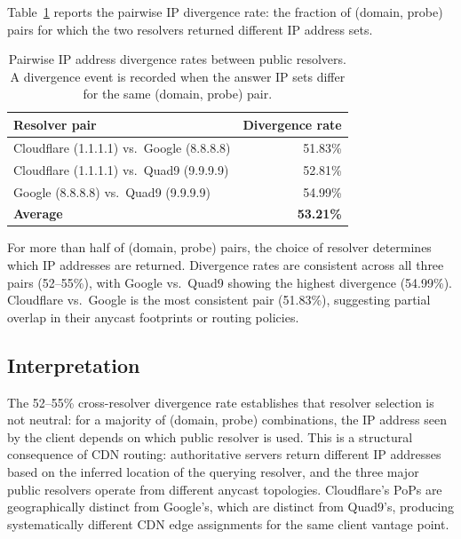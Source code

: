 Table~\ref{tab:4.5} reports the pairwise \ac{IP} divergence rate: the fraction of (domain, probe) pairs for which the two resolvers returned different \ac{IP} address sets.

\begin{table}[H]
\centering
\small
\begin{tabular}{l r}
\toprule
\textbf{Resolver pair} & \textbf{Divergence rate} \\
\midrule
Cloudflare (1.1.1.1) vs.\ Google (8.8.8.8)  & 51.83\% \\
Cloudflare (1.1.1.1) vs.\ Quad9 (9.9.9.9)   & 52.81\% \\
Google (8.8.8.8) vs.\ Quad9 (9.9.9.9)        & 54.99\% \\
\midrule
\textbf{Average}                              & \textbf{53.21\%} \\
\bottomrule
\end{tabular}
\caption{Pairwise \ac{IP} address divergence rates between public resolvers. A divergence event is recorded when the answer \ac{IP} sets differ for the same (domain, probe) pair.}
\label{tab:4.5}
\end{table}

For more than half of (domain, probe) pairs, the choice of resolver determines which \ac{IP} addresses are returned. Divergence rates are consistent across all three pairs (52--55\%), with Google vs.\ Quad9 showing the highest divergence (54.99\%). Cloudflare vs.\ Google is the most consistent pair (51.83\%), suggesting partial overlap in their anycast footprints or routing policies.

\subsection{Interpretation}
\label{subsec:4.5.4}

The 52--55\% cross-resolver divergence rate establishes that resolver selection is not neutral: for a majority of (domain, probe) combinations, the \ac{IP} address seen by the client depends on which public resolver is used. This is a structural consequence of \ac{CDN} routing: authoritative servers return different \ac{IP} addresses based on the inferred location of the querying resolver, and the three major public resolvers operate from different anycast topologies. Cloudflare's \ac{PoPs} are geographically distinct from Google's, which are distinct from Quad9's, producing systematically different \ac{CDN} edge assignments for the same client vantage point.

